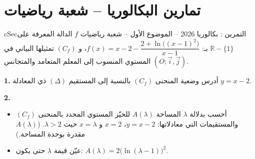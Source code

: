 \documentclass[12pt,a4paper]{article}
\newenvironment{BOX}[2]{\begin{otherlanguage}{english}\begin{arbox}{#1}{#2}}{\end{arbox}\end{otherlanguage}}
\newcounter{exo}
\newenvironment{tamrin}[1]{\stepcounter{exo}\begin{BOX}{cSec}{التمرين \theexo: #1}}{\end{BOX}}
\newcommand{\R}{\mathbb{R}}
\newenvironment{sq}{\begin{itemize}[leftmargin=2.4em,itemsep=3pt]}{\end{itemize}}
\newcommand{\qa}{\item[(أ)]}\newcommand{\qb}{\item[(ب)]}\newcommand{\qc}{\item[(جـ)]}\newcommand{\qd}{\item[(د)]}\newcommand{\qe}{\item[(هـ)]}
\newcommand{\QQ}[1]{\par\smallskip\textbf{#1.} }
\begin{document}
\section{تمارين البكالوريا -- شعبة رياضيات}
\begin{tamrin}{بكالوريا 2026 -- الموضوع الأول -- شعبة رياضيات}
$f$ الدالة المعرفة على $\R-\{1\}$ بـ: $f(x)=x-2-\dfrac{2+\ln\big((x-1)^2\big)}{x-1}$،
و $(C_f)$ تمثيلها البياني في المستوي المنسوب إلى المعلم المتعامد والمتجانس $(O;\vec i,\vec j)$.
\QQ{1} أدرس وضعية المنحنى $(C_f)$ بالنسبة إلى المستقيم $(\Delta)$ ذي المعادلة $y=x-2$.
\QQ{2}
\begin{sq}
\qa أحسب بدلالة $\lambda$ المساحة $A(\lambda)$ للحيّز المستوي المحدد بالمنحنى $(C_f)$ والمستقيمات التي معادلاتها: $y=x-2$، $x=2$ و $x=\lambda$ حيث $\lambda>2$. ($A(\lambda)$ مقدرة بوحدة المساحة.)
\qb عيّن قيمة $\lambda$ حتى يكون: $A(\lambda)=2\big(\ln(\lambda-1)\big)^2$.
\end{sq}
\end{tamrin}
\end{document}
